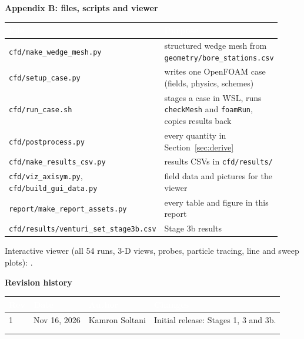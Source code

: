 \documentclass[10pt]{article}
\newcommand{\hd}[1]{\textcolor{white}{\textbf{#1}}}
\renewcommand{\arraystretch}{1.3}
\newcommand{\sectionhead}[1]{{\large\bfseries\color{Navy}#1}\par\vspace{-2pt}{\color{Blue}\rule{\linewidth}{0.8pt}}\par\vspace{3pt}}
\numberwithin{equation}{secn}
\numberwithin{figure}{secn}
\numberwithin{table}{secn}
\newlength{\wFour}
\newcommand{\revrow}[4]{#1 & #2 & #3 & #4\\\hline}
\newcommand{\thead}{\rowcolor{Navy}}
\begin{document}
\sectionhead{Appendix B: files, scripts and viewer}
\begin{center}\small{}
\begin{tabular}{|p{0.36\linewidth}|p{0.56\linewidth}|}
\hline
\thead\hd{File} & \hd{Purpose}\\ \hline
\texttt{cfd/make\_wedge\_mesh.py} & structured wedge mesh from \texttt{geometry/bore\_stations.csv} \\ \hline
\texttt{cfd/setup\_case.py} & writes one OpenFOAM case (fields, physics, schemes) \\ \hline
\texttt{cfd/run\_case.sh} & stages a case in WSL, runs \texttt{checkMesh} and \texttt{foamRun}, copies results back \\ \hline
\texttt{cfd/postprocess.py} & every quantity in Section~\ref{sec:derive} \\ \hline
\texttt{cfd/make\_results\_csv.py} & results CSVs in \texttt{cfd/results/} \\ \hline
\texttt{cfd/viz\_axisym.py}, \texttt{cfd/build\_gui\_data.py} & field data and pictures for the viewer \\ \hline
\texttt{report/make\_report\_assets.py} & every table and figure in this report \\ \hline
\texttt{cfd/results/venturi\_set\_stage3b.csv} & Stage 3b results \\ \hline
\end{tabular}\end{center}
Interactive viewer (all 54 runs, 3-D views, probes, particle tracing, line and sweep plots): .

\vspace{6pt}
\sectionhead{Revision history}
{\renewcommand{\arraystretch}{1.7}
\begin{longtable}{|p{0.09\wFour}|p{0.17\wFour}|p{0.22\wFour}|p{0.52\wFour}|}
\hline
\rowcolor{Navy}\hd{Rev}&\hd{Date}&\hd{Author}&\hd{Changes}\\
\hline
\revrow{1}{Nov 16, 2026}{Kamron Soltani}{Initial release: Stages 1, 3 and 3b.}
\revrow{}{}{}{}
\revrow{}{}{}{}
\end{longtable}}
\end{document}
